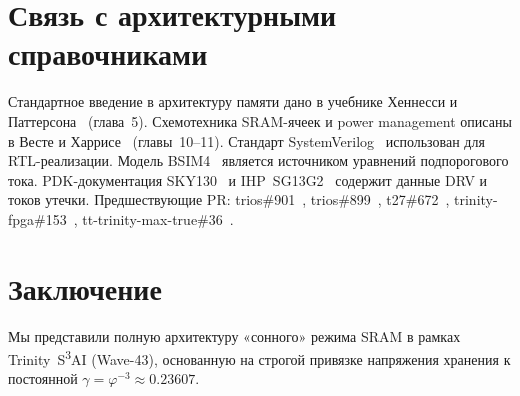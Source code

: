 \section{Связь с архитектурными справочниками}
\label{sec:glava89-refs}

Стандартное введение в архитектуру памяти дано
в учебнике Хеннесси и Паттерсона~\cite{Hennessy-Patterson-CA6} (глава~5).
Схемотехника SRAM-ячеек и power management описаны
в Весте и Харрисе~\cite{Weste-Harris-CMOS4} (главы~10--11).
Стандарт SystemVerilog~\cite{IEEE-SV-1800-2017} использован
для RTL-реализации.
Модель BSIM4~\cite{BSIM4-Manual} является источником
уравнений подпорогового тока.
PDK-документация SKY130~\cite{SKY130-PDK} и IHP~SG13G2~\cite{IHP-SG13G2}
содержит данные DRV и токов утечки.
Предшествующие PR: trios\#901~\cite{trios901}, trios\#899~\cite{trios899},
t27\#672~\cite{t27-672}, trinity-fpga\#153~\cite{trinityfpga153},
tt-trinity-max-true\#36~\cite{ttmt36}.

\section{Заключение}
\label{sec:glava89-conclusion}

Мы представили полную архитектуру «сонного» режима SRAM
в рамках Trinity~S\textsuperscript{3}AI (Wave-43),
основанную на строгой привязке напряжения хранения
к постоянной $\gamma = \varphi^{-3} \approx 0.23607$.

